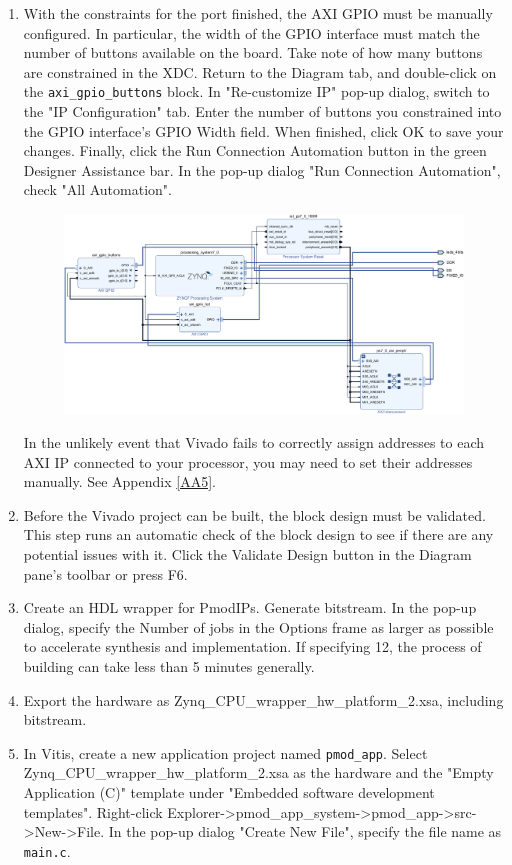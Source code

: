 \documentclass[a4paper,12pt,twoside]{article}
\begin{document}
\begin{enumerate}
\begin{verbatim}
    \end{verbatim}
    \item With the constraints for the port finished, the AXI GPIO must be manually configured. In particular, the width of the GPIO interface must match the number of buttons available on the board. Take note of how many buttons are constrained in the XDC. Return to the Diagram tab, and double-click on the \texttt{axi\_gpio\_buttons} block. In "Re-customize IP" pop-up dialog, switch to the "IP Configuration" tab. Enter the number of buttons you constrained into the GPIO interface's GPIO Width field. When finished, click OK to save your changes. Finally, click the Run Connection Automation button in the green Designer Assistance bar. In the pop-up dialog "Run Connection Automation", check "All Automation".
    \begin{figure}[H]
        \centering
        \includegraphics[width=\textwidth]{images/20.png}
    \end{figure}
    In the unlikely event that Vivado fails to correctly assign addresses to each AXI IP connected to your processor, you may need to set their addresses manually. See Appendix \ref{AA5}.
    \item Before the Vivado project can be built, the block design must be validated. This step runs an automatic check of the block design to see if there are any potential issues with it. Click the Validate Design button in the Diagram pane's toolbar or press F6.
    \item Create an HDL wrapper for PmodIPs. Generate bitstream. In the pop-up dialog, specify the Number of jobs in the Options frame as larger as possible to accelerate synthesis and implementation. If specifying 12, the process of building can take less than 5 minutes generally.
    \item Export the hardware as Zynq\_CPU\_wrapper\_hw\_platform\_2.xsa, including bitstream.
    \item In Vitis, create a new application project named \texttt{pmod\_app}. Select\\
    Zynq\_CPU\_wrapper\_hw\_platform\_2.xsa as the hardware and the "Empty Application (C)" template under "Embedded software development templates". Right-click Explorer->pmod\_app\_system->pmod\_app->src->New->File. In the pop-up dialog "Create New File", specify the file name as \texttt{main.c}.
\end{enumerate}
\end{document}
